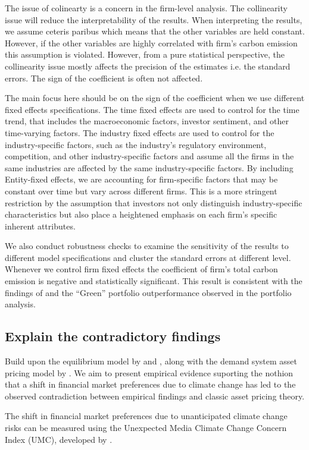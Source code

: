\documentclass[12pt]{article}
\begin{document}
The issue of colinearty is a concern in the firm-level analysis. The collinearity issue will reduce the interpretability of the results. When interpreting the results, we assume ceteris paribus which means that the other variables are held constant. However, if the other variables are highly correlated with firm's carbon emission this assumption is violated. However, from a pure statistical perspective, the collinearity issue mostly affects the precision of the estimates i.e. the standard errors. The sign of the coefficient is often not affected.

The main focus here should be on the sign of the coefficient when we use different fixed effects specifications. The time fixed effects are used to control for the time trend, that includes the macroeconomic factors, investor sentiment, and other time-varying factors. The industry fixed effects are used to control for the industry-specific factors, such as the industry's regulatory environment, competition, and other industry-specific factors and assume all the firms in the same industries are affected by the same industry-specific factors. By including Entity-fixed effects, we are accounting for firm-specific factors that may be constant over time but vary across different firms. This is a more stringent restriction by the assumption that investors not only distinguish industry-specific characteristics but also place a heightened emphasis on each firm's specific inherent attributes.

We also conduct robustness checks to examine the sensitivity of the results to different model specifications and cluster the standard errors at different level. Whenever we control firm fixed effects the coefficient of firm's total carbon emission is negative and statistically significant. This result is consistent with the findings of \cite{pastor2022dissecting} and the ``Green'' portfolio outperformance observed in the portfolio analysis.

\subsection{Explain the contradictory findings}
Build upon the equilibrium model by \cite{pastor2021sustainable} and \cite{pedersen2021responsible}, along with the demand system asset pricing model by \cite{koijen2019demand}. We aim to present empirical evidence suporting the nothion that a shift in financial market preferences due to climate change has led to the observed contradiction between empirical findings and classic asset pricing theory.

The shift in financial market preferences due to unanticipated climate change risks can be measured using the Unexpected Media Climate Change Concern Index (UMC), developed by \cite{ardia2022climate}.
\clearpage


\end{document}
